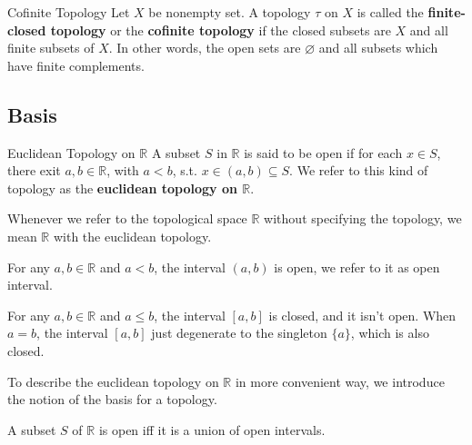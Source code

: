 \begin{definition}{Cofinite Topology}{}
    Let $X$ be nonempty set. A topology $\tau$ on $X$ is called the
    \textbf{finite-closed topology} or the \textbf{cofinite topology}
    if the closed subsets are $X$ and all finite subsets of $X$. In
    other words, the open sets are $\varnothing$ and all subsets which
    have finite complements.
\end{definition}

\subsection{Basis}\label{sub:Basis} %

\begin{definition}{Euclidean Topology on $\mathbb{R}$}{}
    A subset $S$ in $\mathbb{R}$ is said to be open if for each $x
    \in S$, there exit $a,b \in \mathbb{R}$, with $a < b$, s.t. $x
    \in (a,b) \subseteq S$. We refer to this kind of topology as the
    \textbf{euclidean topology on $\mathbb{R}$}.
\end{definition}

\begin{remarks}
    Whenever we refer to the topological space $\mathbb{R}$ without
    specifying the
    topology, we mean $\mathbb{R}$ with the euclidean topology.
\end{remarks}

\begin{example}
    For any $a,b \in \mathbb{R}$ and $a<b$, the interval $(a,b)$ is
    open, we refer to it as open interval.
\end{example}

\begin{example}
    For any $a,b \in \mathbb{R}$ and $a \le b$, the interval $[a,b]$ is closed,
    and it isn't open. When $a = b$, the interval $[a,b]$ just
    degenerate to the singleton $\{a\}$, which is also closed.
\end{example}

To describe the euclidean topology on $\mathbb{R}$ in more convenient
way, we introduce the notion of the basis for a topology.

\begin{proposition}{}{}
    A subset $S$ of $\mathbb{R}$ is open iff it is a union of open intervals.
\end{proposition}

